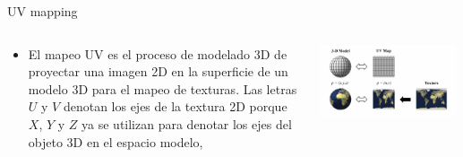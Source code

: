 \documentclass[aspectratio=169,compress]{beamer}
\begin{document}
\begin{frame}{UV mapping}
\begin{columns}
\begin{column}{0.5\textwidth}
\begin{itemize}
\item El mapeo UV es el proceso de modelado 3D de proyectar una imagen 2D en la superficie de un modelo 3D para el mapeo de texturas. Las letras $U$ y $V$ denotan los ejes de la textura 2D porque $X$, $Y$ y $Z$ ya se utilizan para denotar los ejes del objeto 3D en el espacio modelo,
\end{itemize}
\end{column}
\begin{column}{0.5\textwidth}
    \begin{center}
         \includegraphics[width=0.98\textwidth]{FigsOpenGL/UVMapping}
     \end{center}
\end{column}
\end{columns}
\end{frame}
\end{document}
